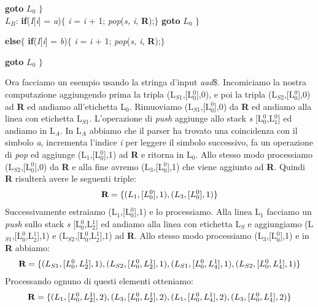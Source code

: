 \hspace{1.5cm}\textbf{goto} $L_0$ $\}$ \\
$L_B$:  \textbf{if}(\textit{I}[\textit{i}] = \textit{a})$\{$ \textit{i} = \textit{i} + 1; \textit{pop}(\textit{s, i}, \textbf{R});$\}$ \textbf{goto} $L_0$ $\}$ \par
\hspace{0.2cm} \textbf{else}$\{$ \textbf{if}(\textit{I}[\textit{i}] = \textit{b})$\{$ \textit{i} = \textit{i} + 1; \textit{pop}(\textit{s, i}, \textbf{R});$\}$ \par
\hspace{1.5cm}\textbf{goto} $L_0$ $\}$ \par 
\vspace{0.3cm}
Ora facciamo un esempio usando la stringa d'input \textit{aad}$\$$. Incomiciamo la nostra computazione aggiungendo prima la tripla (L$_{S1}$,[L$_0^{0}$],0), e poi la tripla (L$_{S2}$,[L$_0^{0}$],0) ad \textbf{R} ed andiamo all'etichetta L$_0$. Rimuoviamo (L$_{S1}$,[L$_0^{0}$],0) da \textbf{R} ed andiamo alla linea con etichetta L$_{S1}$. L'operazione di \textit{push} aggiunge allo stack \textit{s} [L$_0^{0}$,L$_1^{0}$] ed andiamo in L$_A$. In L$_A$ abbiamo che il parser ha trovato una coincidenza con il simbolo \textit{a}, incrementa l'indice \textit{i} per leggere il simbolo successivo, fa un operazione di \textit{pop} ed aggiunge  (L$_{1}$,[L$_0^{0}$],1) ad \textbf{R} e ritorna in L$_0$. Allo stesso modo processiamo  (L$_{S2}$,[L$_0^{0}$],0) da \textbf{R} e alla fine avremo (L$_{3}$,[L$_0^{0}$],1) che viene aggiunto ad \textbf{R}. Quindi \textbf{R} risulterà avere le seguenti triple:
\begin{align}
	\textbf{R} = \{ (L_1,[L_0^{0}],1), (L_3,[L_0^{0}],1) \} \notag
\end{align}
Successivamente estraiamo (L$_{1}$,[L$_0^{0}$],1) e lo processiamo. Alla linea L$_1$ facciamo un \textit{push} sullo stack \textit{s} [L$_0^{0}$,L$_2^{1}$] ed andiamo alla linea con etichetta L$_S$ e aggiungiamo (L$_{S1}$,[L$_0^{0}$,L$_2^{1}$],1) e (L$_{S2}$,[L$_0^{0}$,L$_2^{1}$],1) ad \textbf{R}. Allo stesso modo processiamo (L$_{3}$,[L$_0^{0}$],1) e in \textbf{R} abbiamo:
\begin{align}
	\textbf{R} = \{ (L_{S1},[L_0^{0},L_2^{1}],1), (L_{S2},[L_0^{0},L_2^{1}],1), (L_{S1},[L_0^{0},L_4^{1}],1), (L_{S2},[L_0^{0},L_4^{1}],1) \} \notag
\end{align}
Processando ognuno di questi elementi otteniamo:
\begin{align}
	\textbf{R} = \{ (L_{1},[L_0^{0},L_2^{1}],2), (L_{3},[L_0^{0},L_2^{1}],2), (L_{1},[L_0^{0},L_4^{1}],2),  (L_{3},[L_0^{0},L_4^{1}],2) \} \notag
\end{align}
